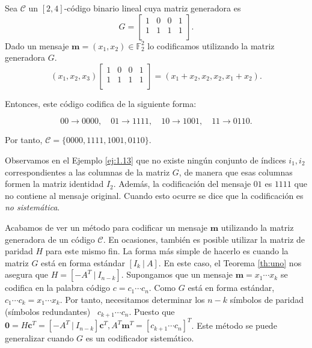 \begin{ejemplo}\label{ej:1.13}

    Sea $\mathcal{C}$ un $[2,4]$-código binario lineal cuya matriz generadora es
    $$ G = \left[\begin{array}{cccc}
      1&0&0&1\\
      1&1&1&1\\
      \end{array}\right].
      $$
  Dado un mensaje $\mathbf{m} = (x_1,x_2) \in \mathds{F}_{2}^2$ lo codificamos utilizando la matriz generadora $G$.
  $$ (x_1,x_2,x_3) \left[\begin{array}{cccc}
    1&0&0&1\\
    1&1&1&1\\
    \end{array}\right] = (x_1 + x_2,x_2,x_2,x_1 + x_2).$$

    Entonces, este código codifica de la siguiente forma: 

  $$ 00 \rightarrow 0000, \quad		01 \rightarrow 1111, \quad			10 \rightarrow 1001, \quad			11 \rightarrow 0110.$$

  Por tanto, $\mathcal{C} = \{0000,1111,1001,0110\}$.
\end{ejemplo}

Observamos en el Ejemplo \ref{ej:1.13} que no existe ningún conjunto de índices $i_1,i_2$ correspondientes a las columnas de la matriz $G$, de manera que esas columnas formen la matriz identidad $I_2$. Además, la codificación del mensaje $01$ es $1111$ que no contiene al mensaje original. Cuando esto ocurre se dice que la codificación es \emph{no sistemática}.

Acabamos de ver un método para codificar un mensaje $\mathbf{m}$ utilizando la matriz generadora de un código $\mathcal{C}$. En ocasiones, también es posible utilizar la matriz de paridad $H$ para este mismo fin. La forma más simple de hacerlo es cuando la matriz $G$ está en forma estándar $[I_k \ \vert \ A]$. En este caso,  el Teorema \ref{th:uno} nos asegura que $H = \left[ - A^T  \ \vert \ I_{n-k} \right]$. Supongamos que un mensaje $\textbf{m} = x_1\cdots x_k$ se codifica en la palabra código $c = c_1\cdots c_n$. Como $G$ está en forma estándar, $c_1\cdots c_k = x_1\cdots x_k$. Por tanto, necesitamos determinar los $n-k$ símbolos de paridad (símbolos redundantes) \ $c_{k+1}\cdots c_n$. Puesto que $\mathbf{0} = H\mathbf{c}^T = \left[ - A^T  \ \vert \ I_{n-k} \right]\mathbf{c}^T, A^T\mathbf{m}^T = [c_{k+1}\cdots c_n]^T$. Este método se puede generalizar cuando $G$ es un codificador sistemático.

